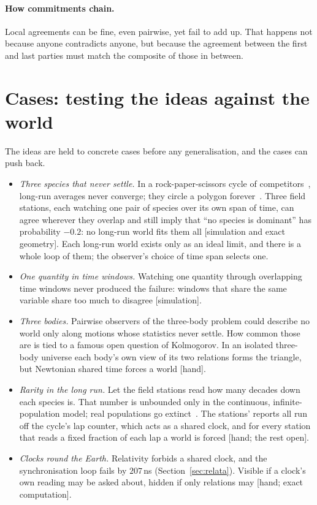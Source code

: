\documentclass[11pt]{article}
\newcommand{\st}[1]{\textsf{\small[#1]}}
\begin{document}
\paragraph{How commitments chain.} Local agreements can be fine, even pairwise,
yet fail to add up. That happens not because anyone contradicts anyone, but
because the agreement between the first and last parties must match the
composite of those in between.

\section{Cases: testing the ideas against the world}\label{sec:cases}
The ideas are held to concrete cases before any generalisation, and the cases
can push back.
\begin{itemize}[nosep]
  \item \emph{Three species that never settle.} In a rock-paper-scissors cycle of
    competitors~\cite{maylonard1975}, long-run averages never converge; they
    circle a polygon forever~\cite{gaunersdorfer1992,takens1994}. Three field
    stations, each watching one pair of species over its own span of time, can
    agree wherever they overlap and still imply that ``no species is dominant''
    has probability $-0.2$: no long-run world fits them all \st{simulation and
    exact geometry}. Each long-run world exists only as an ideal limit, and there
    is a whole loop of them; the observer's choice of time span selects one.
  \item \emph{One quantity in time windows.} Watching one quantity through
    overlapping time windows never produced the failure: windows that share the
    same variable share too much to disagree \st{simulation}.
  \item \emph{Three bodies.} Pairwise observers of the three-body problem could
    describe no world only along motions whose statistics never settle. How common
    those are is tied to a famous open question of Kolmogorov. In an isolated
    three-body universe each body's own view of its two relations forms the
    triangle, but Newtonian shared time forces a world \st{hand}.
  \item \emph{Rarity in the long run.} Let the field stations read how many
    decades down each species is. That number is unbounded only in the
    continuous, infinite-population model; real populations go
    extinct~\cite{barendregtthomas2023}. The stations' reports all run off the
    cycle's lap counter, which acts as a shared clock, and for every station that
    reads a fixed fraction of each lap a world is forced \st{hand; the rest open}.
  \item \emph{Clocks round the Earth.} Relativity forbids a shared clock, and the
    synchronisation loop fails by $207$\,ns (Section~\ref{sec:relata}). Visible
    if a clock's own reading may be asked about, hidden if only relations may
    \st{hand; exact computation}.
\end{itemize}
\end{document}
